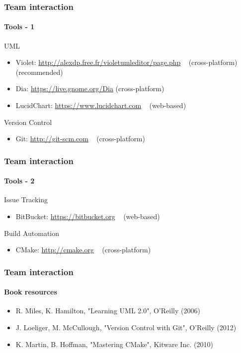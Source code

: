 \begin{frame}
\frametitle{Team interaction}
\framesubtitle{Tools - 1}
\begin{block}{UML}
\begin{itemize}
\item Violet: \url{http://alexdp.free.fr/violetumleditor/page.php} \,\,\, (cross-platform) (recommended)
\item Dia: \url{https://live.gnome.org/Dia} (cross-platform)
\item LucidChart: \url{https://www.lucidchart.com} \,\,\, (web-based)
\end{itemize}
\end{block}

\begin{block}{Version Control}
\begin{itemize}
\item Git: \url{http://git-scm.com} \,\,\, (cross-platform)
\end{itemize}
\end{block}

\end{frame}

\begin{frame}
\frametitle{Team interaction}
\framesubtitle{Tools - 2}

\begin{block}{Issue Tracking}
\begin{itemize}
\item BitBucket: \url{https://bitbucket.org} \,\,\, (web-based)
\end{itemize}
\end{block}

\begin{block}{Build Automation}
\begin{itemize}
\item CMake: \url{http://cmake.org} \,\,\, (cross-platform)
\end{itemize}
\end{block}

\end{frame}

\begin{frame}
\frametitle{Team interaction}
\framesubtitle{Book resources}
\begin{itemize}
\item R. Miles, K. Hamilton, "Learning UML 2.0", O'Reilly (2006)
\item J. Loeliger, M. McCullough, "Version Control with Git", O'Reilly (2012)
\item K. Martin, B. Hoffman, "Mastering CMake", Kitware Inc. (2010)
\end{itemize}
\end{frame}

